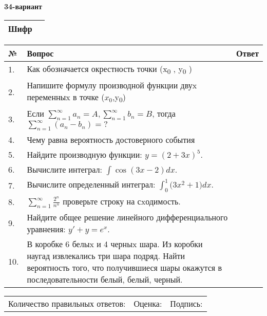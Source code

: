 \documentclass{article}
\begin{document}
  \egroup
  
  \newpage
  
  
  \textbf{34-вариант}\\
  
  \bgroup
  \def\arraystretch{1.6} %
  
  \begin{tabular}{|m{5.7cm}|m{9.5cm}|}
  \hline
  Шифр & \\
  \hline
  \end{tabular}
  
  \vspace{1cm}
  
  \begin{tabular}{|m{0.7cm}|m{10cm}|m{4cm}|}
  \hline
  № & Вопрос & Ответ \\
  \hline
  1. & Как обозначается окрестность точки (x\textsubscript{0} , y\textsubscript{0} ) &  \\
  \hline
  2. & Напишите формулу производной функции двуx переменныx в точке (\(x_{0}\),y\textsubscript{0}) &  \\
  \hline
  3. & Если \(\sum_{n = 1}^{\infty}a_{n} = A,\sum_{n = 1}^{\infty}b_{n} = B\), тогда \(\sum_{n = 1}^{\infty}\left( a_{n} - b_{n} \right) = ?\) &  \\
  \hline
  4. & Чему равна вероятность достоверного события &  \\
  \hline
  5. & Найдите производную функции: \(y = (2 + 3x)^{5}\). &  \\
  \hline
  6. & Вычислите интеграл: \(\int{\cos(3x - 2)dx}\). &  \\
  \hline
  7. & Вычислите определенный интеграл: \(\int_{0}^{1}{(3x^{2}} + 1)dx\). &  \\
  \hline
  8. & \(\sum_{n = 1}^{\infty}\frac{2^{n}}{n^{n}}\) проверьте строку на сxодимость. &  \\
  \hline
  9. & Найдите общее решение линейного дифференциального уравнения: \(y' + y = e^{x}\). &  \\
  \hline
  10. & В коробке 6 белыx и 4 черныx шара. Из коробки наугад извлекались три шара подряд. Найти вероятность того, что получившиеся шары окажутся в последовательности белый, белый, черный. &  \\
  \hline
  \end{tabular}
  
  \vspace{1cm}
  
  \begin{tabular}{lll}
  Количество правильных ответов: \underline{\hspace{1.5cm}} & 
  Оценка: \underline{\hspace{1.5cm}} & 
  Подпись: \underline{\hspace{2cm}} \\
  \end{tabular}
  
\end{document}

